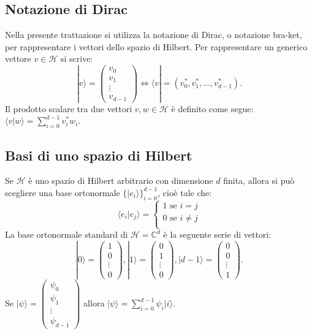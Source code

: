 \subsection{Notazione di Dirac}
Nella presente trattazione si utilizza la notazione di Dirac, o notazione bra-ket, per rappresentare i vettori dello spazio di Hilbert. Per rappresentare un generico vettore $v \in \mathcal{H}$ si scrive:
\begin{equation}
  | v \rangle = \begin{pmatrix}
    v_0    \\
    v_1    \\
    \vdots \\
    v_{d - 1}
  \end{pmatrix}
  \iff
  \langle v | = (v_0^*, v_1^*, \dots, v_{d - 1}^*).
\end{equation}
Il prodotto scalare tra due vettori $v, w \in \mathcal{H}$ è definito come segue: $\langle v | w \rangle = \sum_{i = 0}^{d - 1}{v_i^* w_i}$.
\subsection{Basi di uno spazio di Hilbert}
Se $\mathcal{H}$ è uno spazio di Hilbert arbitrario con dimensione $d$ finita, allora si può scegliere una base ortonormale $\{|e_i\rangle\}^{d - 1}_{i=0}$, cioè tale che:
\begin{equation}
  \langle e_i | e_j \rangle =
  \begin{cases}
    1 \text{ se } i = j    \\
    0 \text{ se } i \neq j \\
  \end{cases}
\end{equation}
La base ortonormale standard di $\mathcal{H} = \mathbb{C}^d$ è la seguente serie di vettori:
\begin{equation}
  |0\rangle = \begin{pmatrix}
    1      \\
    0      \\
    \vdots \\
    0
  \end{pmatrix},
  |1\rangle = \begin{pmatrix}
    0      \\
    1      \\
    \vdots \\
    0
  \end{pmatrix},
  |d - 1\rangle = \begin{pmatrix}
    0      \\
    0      \\
    \vdots \\
    1
  \end{pmatrix}.
\end{equation}
Se $|\psi\rangle = \begin{pmatrix} \psi_0\\\psi_1\\\vdots\\\psi_{d - 1} \end{pmatrix}$ allora $|\psi\rangle = \sum_{i = 0}^{d - 1}{\psi_i|i\rangle}$.

